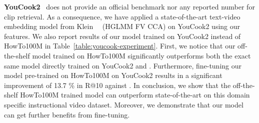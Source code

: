 \documentclass[10pt,twocolumn,letterpaper]{article}
\begin{document}
\begin{table}[t]
  \setlength{\tabcolsep}{3pt}
    \centering  
   \vspace{-2mm}
 \caption{\small YouCook2 clip retrieval results. PT denotes: pre-trained, while FT denotes: fine-tuned.}
 \vspace{-2mm}
      \label{table:youcook-experiment}
\end{table}


{\bf \noindent YouCook2}~\cite{youcook2} does not provide an official benchmark nor any reported number for clip retrieval.
As a consequence, we have applied a state-of-the-art text-video embedding model from Klein~\etal~\cite{klein15associating} (HGLMM FV CCA) on YouCook2 using our features.
We also report results of our model trained on YouCook2 instead of HowTo100M in Table~\ref{table:youcook-experiment}.
First, we notice that our off-the-shelf model trained on HowTo100M significantly outperforms both the exact same model directly trained on YouCook2 and \cite{klein15associating}.
Furthermore, fine-tuning our model pre-trained on HowTo100M on YouCook2 results in a significant improvement of 13.7 \% in R@10 against \cite{klein15associating}.
In conclusion, we show that the off-the-shelf HowTo100M trained model can outperform state-of-the-art on this domain specific instructional video dataset.
Moreover, we demonstrate that our model can get further benefits from fine-tuning.
\end{document}
